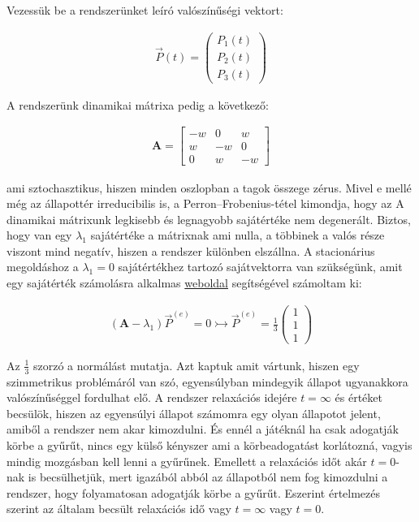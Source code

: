 \documentclass[a4paper, 12pt]{article}
\numberwithin{equation}{section}          %
\numberwithin{figure}{subsection}
\begin{document}
Vezessük be a rendszerünket leíró valószínűségi vektort:

\begin{center}
	\begin{gather}
		\vec{P}(t) = \begin{pmatrix}P_1(t)\\P_2(t)\\P_3(t)\end{pmatrix}
	\end{gather}
\end{center}

\newpage
A rendszerünk dinamikai mátrixa pedig a következő:

\begin{center}
	\begin{gather}
	\textbf{A} = \begin{bmatrix}
	-w & 0 & w\\
	w & -w & 0 \\
	0 & w & -w
	\end{bmatrix}
	\end{gather}
\end{center}

ami sztochasztikus, hiszen minden oszlopban a tagok összege zérus. Mivel e mellé még az állapottér irreducibilis is, a Perron–Frobenius-tétel kimondja, hogy az A dinamikai mátrixunk legkisebb és legnagyobb
sajátértéke nem degenerált. Biztos, hogy van egy $\lambda_1$ sajátértéke a mátrixnak ami nulla, a többinek a valós része viszont mind negatív, hiszen a rendszer különben elszállna. A stacionárius megoldáshoz a
$\lambda_1 = 0$ sajátértékhez tartozó sajátvektorra van szükségünk, amit egy sajátérték számolásra alkalmas \href{http://matrixcalc.org/en/}{weboldal} segítségével
számoltam ki:

\begin{center}
	\begin{gather}
	\left( \textbf{A} -\lambda_1 \right)\vec{P}^{(e)} = 0 \rightarrowtail  \vec{P}^{(e)} = \frac{1}{3}\begin{pmatrix}1\\1\\1\end{pmatrix}
	\end{gather}
\end{center}


Az $\frac{1}{3}$ szorzó a normálást mutatja. Azt kaptuk amit vártunk, hiszen egy szimmetrikus problémáról
van szó, egyensúlyban mindegyik állapot ugyanakkora valószínűséggel fordulhat elő. A rendszer relaxációs
idejére  $t = \infty $ és értéket becsülök, hiszen az egyensúlyi állapot számomra egy olyan állapotot jelent, amiből
a rendszer nem akar kimozdulni. És ennél a játéknál ha csak adogatják körbe a gyűrűt, nincs egy külső
kényszer ami a körbeadogatást korlátozná, vagyis mindig mozgásban kell lenni a gyűrűnek. Emellett a
relaxációs időt akár $t = 0$-nak is becsülhetjük, mert igazából abból az állapotból nem fog kimozdulni
a rendszer, hogy folyamatosan adogatják körbe a gyűrűt. Eszerint értelmezés szerint az általam becsült
relaxációs idő vagy $t = \infty $ vagy $t = 0$.
\end{document}
